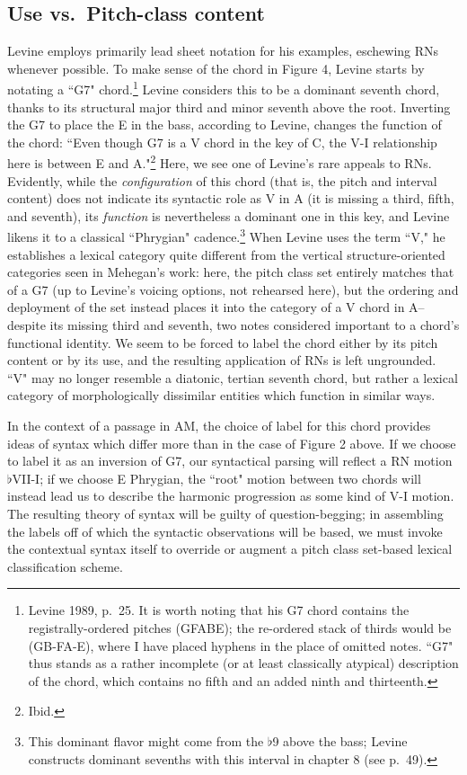 \subsection{Use vs.\ Pitch-class content}
Levine employs primarily lead sheet notation for his examples, eschewing RNs whenever possible.  To make sense of the chord in Figure 4, Levine starts by notating a ``G7" chord.\footnote{Levine 1989, p.\ 25.  It is worth noting that his G7 chord contains the registrally-ordered pitches (GFABE); the re-ordered stack of thirds would be (GB-FA-E), where I have placed hyphens in the place of omitted notes.  ``G7" thus stands as a rather incomplete (or at least classically atypical) description of the chord, which contains no fifth and an added ninth and thirteenth.}  Levine considers this to be a dominant seventh chord, thanks to its structural major third and minor seventh above the root.  Inverting the G7 to place the E in the bass, according to Levine, changes the function of the chord: ``Even though G7 is a V chord in the key of C, the V-I relationship here is between E and A."\footnote{Ibid.}  Here, we see one of Levine's rare appeals to RNs.  Evidently, while the \emph{configuration} of this chord (that is, the pitch and interval content) does not indicate its syntactic role as V in A (it is missing a third, fifth, and seventh), its \emph{function} is nevertheless a dominant one in this key, and Levine likens it to a classical ``Phrygian" cadence.\footnote{This dominant flavor might come from the $\flat$9 above the bass; Levine constructs dominant sevenths with this interval in chapter 8 (see p.\ 49).}  When Levine uses the term ``V," he establishes a lexical category quite different from the vertical structure-oriented categories seen in Mehegan's work: here, the pitch class set entirely matches that of a G7 (up to Levine's voicing options, not rehearsed here), but the ordering and deployment of the set instead places it into the category of a V chord in A-- despite its missing third and seventh, two notes considered important to a chord's functional identity.  We seem to be forced to label the chord either by its pitch content or by its use, and the resulting application of RNs is left ungrounded.  ``V" may no longer resemble a diatonic, tertian seventh chord, but rather a lexical category of morphologically dissimilar entities which function in similar ways.

In the context of a passage in AM, the choice of label for this chord provides ideas of syntax which differ more than in the case of Figure 2 above.  If we choose to label it as an inversion of G7, our syntactical parsing will reflect a RN motion $\flat$VII-I; if we choose E Phrygian, the ``root" motion between two chords will instead lead us to describe the harmonic progression as some kind of V-I motion.  The resulting theory of syntax will be guilty of question-begging; in assembling the labels off of which the syntactic observations will be based, we must invoke the contextual syntax itself to override or augment a pitch class set-based lexical classification scheme.

